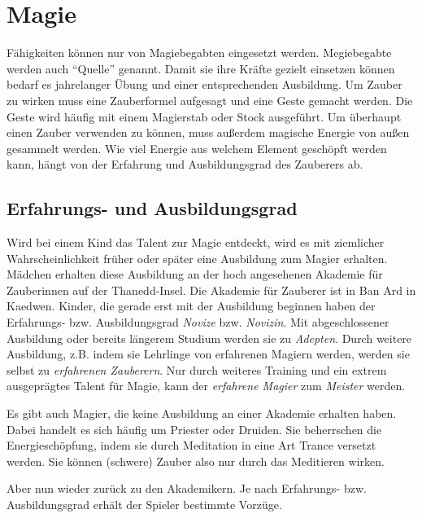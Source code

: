 {\let\clearpage\relax\chapter{Magie}}
Fähigkeiten können nur von Magiebegabten eingesetzt werden. Megiebegabte werden auch "`Quelle"' genannt. Damit sie ihre Kräfte gezielt einsetzen können bedarf es jahrelanger Übung und einer entsprechenden Ausbildung. Um Zauber zu wirken muss eine Zauberformel aufgesagt und eine Geste gemacht werden. Die Geste wird häufig mit einem Magierstab oder Stock ausgeführt. Um überhaupt einen Zauber verwenden zu können, muss außerdem magische Energie von außen gesammelt werden. Wie viel Energie aus welchem Element geschöpft werden kann, hängt von der Erfahrung und Ausbildungsgrad des Zauberers ab.

\section{Erfahrungs- und Ausbildungsgrad}
\label{chap:ausbildungsgrad}
Wird bei einem Kind das Talent zur Magie entdeckt, wird es mit ziemlicher Wahrscheinlichkeit früher oder später eine Ausbildung zum Magier erhalten. Mädchen erhalten diese Ausbildung an der hoch angesehenen Akademie für Zauberinnen auf der Thanedd-Insel. Die Akademie für Zauberer ist in Ban Ard in Kaedwen. Kinder, die gerade erst mit der Ausbildung beginnen haben der Erfahrungs- bzw. Ausbildungsgrad \textit{Novize} bzw. \textit{Novizin}. Mit abgeschlossener Ausbildung oder bereits längerem Studium werden sie zu \textit{Adepten}. Durch weitere Ausbildung, z.B. indem sie Lehrlinge von erfahrenen Magiern werden, werden sie selbst zu \textit{erfahrenen Zauberern}. Nur durch weiteres Training und ein extrem ausgeprägtes Talent für Magie, kann der \textit{erfahrene Magier} zum \textit{Meister} werden.

Es gibt auch Magier, die keine Ausbildung an einer Akademie erhalten haben. Dabei handelt es sich häufig um Priester oder Druiden. Sie beherrschen die Energieschöpfung, indem sie durch Meditation in eine Art Trance versetzt werden. Sie können (schwere) Zauber also nur durch das Meditieren wirken. 

Aber nun wieder zurück zu den Akademikern. Je nach Erfahrungs- bzw. Ausbildungsgrad erhält der Spieler bestimmte Vorzüge.

